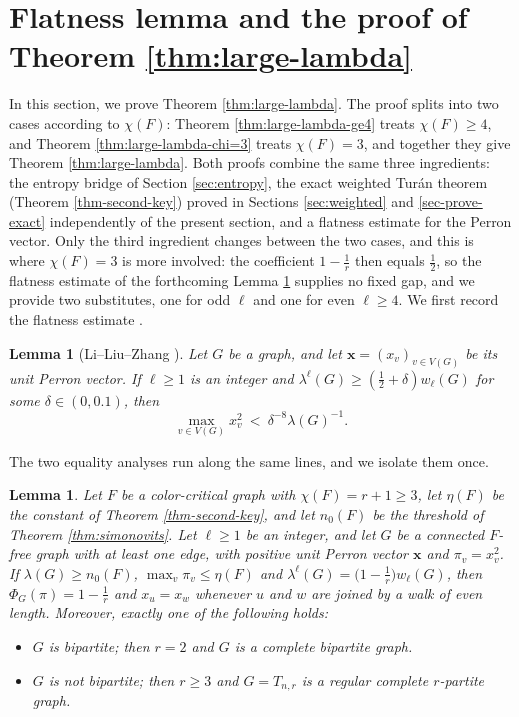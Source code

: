 \documentclass[11pt, a4paper]{article}
\newtheorem{lemma}[theorem]{Lemma}
\theoremstyle{definition}
\theoremstyle{plain}
\renewcommand{\le}{\leqslant}
\renewcommand{\ge}{\geqslant}
\begin{document}
\section{Flatness lemma and the proof of
Theorem \ref{thm:large-lambda}} 

\label{sec:main-proof}

In this section, we prove Theorem \ref{thm:large-lambda}.
The proof splits into two cases according to 
$\chi (F)$: Theorem \ref{thm:large-lambda-ge4} treats
$\chi (F)\ge 4$, and Theorem \ref{thm:large-lambda-chi=3}
treats $\chi (F)=3$, and together they give Theorem
\ref{thm:large-lambda}. Both proofs combine the same three
ingredients: the entropy bridge of Section \ref{sec:entropy}, the exact weighted Tur\'{a}n theorem (Theorem
\ref{thm-second-key}) proved in Sections
\ref{sec:weighted} and \ref{sec-prove-exact} independently
of the present section, and a flatness estimate for the
Perron vector. 
Only the third ingredient changes between
the two cases, and this is where $\chi (F)=3$ is more
involved: the coefficient $1-\frac1r$ then equals
$\frac12$, so the flatness estimate of the forthcoming Lemma \ref{lem:perron-flatness} supplies no fixed gap, and we provide two substitutes, one for odd $\ell$ and one for even $\ell \ge 4$. 
We first record the flatness estimate 
\cite[Lemma 3.1]{LLZ-ESS}. 

\begin{lemma}[Li--Liu--Zhang \cite{LLZ-ESS}]
\label{lem:perron-flatness}
Let $G$ be a graph, and let $\bm{x}=(x_v)_{v\in V(G)}$ be
its unit Perron vector. If $\ell \ge 1$ is an integer and
$\lambda^\ell (G)\ge \left(\frac12+\delta \right)
w_\ell (G)$ for some $\delta \in (0,0.1)$, then
\[ 
  \max_{v\in V(G)} x_v^2 \ < \ \delta^{-8}\lambda (G)^{-1}.
\] 
\end{lemma}

The two equality analyses run along the same lines, and we isolate them once.

\begin{lemma} 
\label{lem:equality-rigidity}
Let $F$ be a color-critical graph with
$\chi (F)=r+1\ge 3$, let $\eta (F)$ be the constant of
Theorem \ref{thm-second-key}, and let $n_0(F)$ be the
threshold of Theorem \ref{thm:simonovits}. Let
$\ell \ge 1$ be an integer, and let $G$ be a connected
$F$-free graph with at least one edge, with positive unit
Perron vector $\bm{x}$ and $\pi_v=x_v^2$. If
$ \lambda (G)\ge n_0(F)$, 
 $ \max_{v}\pi_v\le \eta (F)$ and 
$  \lambda^{\ell}(G)=\bigl(1-\frac1r\bigr)w_\ell (G)$, 
then $\Phi_G(\pi )=1-\frac1r$ and $x_u=x_w$ whenever $u$
and $w$ are joined by a walk of even length. Moreover,
exactly one of the following holds:
\begin{itemize}
\item[\rm (a)] $G$ is bipartite; then $r=2$ and $G$ is a
complete bipartite graph.

\item[\rm (b)] $G$ is not bipartite; then $r\ge 3$ and
$G=T_{n,r}$ is a regular complete $r$-partite graph.
\end{itemize}
\end{lemma}
\end{document}

